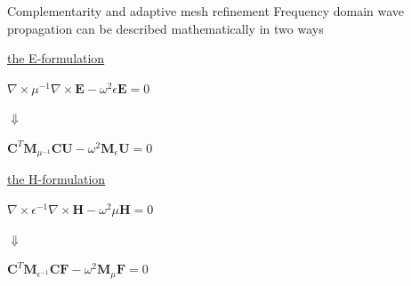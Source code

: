 \documentclass{beamer}
\begin{document}
\begin{frame}{Complementarity and adaptive mesh refinement}
    Frequency domain wave propagation can be described mathematically in two ways
    \vspace{5mm}

    \pause
    \begin{minipage}{0.48\textwidth}
        \begin{center}
        \underline{the E-formulation}

        $\nabla\times\mu^{-1}\nabla\times\mathbf{E} - \omega^2\epsilon\mathbf{E} = 0$

        $\Downarrow$

        $\mathbf{C}^T\mathbf{M}_{\mu^{-1}}\mathbf{CU} - \omega^2\mathbf{M}_{\epsilon}\mathbf{U} = 0$
    \end{center}

    \end{minipage}
    \pause
    \begin{minipage}{0.48\textwidth}
        \begin{center}
        \underline{the H-formulation}

        $\nabla\times\epsilon^{-1}\nabla\times\mathbf{H} - \omega^2\mu\mathbf{H} = 0$

        $\Downarrow$

        $\mathbf{C}^T\mathbf{M}_{\epsilon^{-1}}\mathbf{CF} - \omega^2\mathbf{M}_{\mu}\mathbf{F} = 0$
    \end{center}

    \end{minipage}

    \pause
    \vspace{5mm}


\end{frame}
\end{document}
